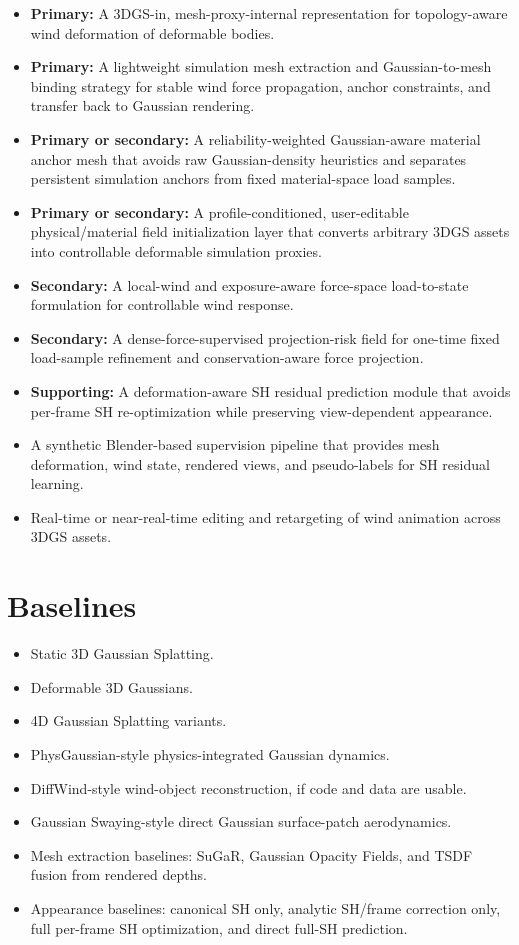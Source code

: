 \documentclass[11pt]{article}
\begin{document}
\begin{itemize}
  \item \textbf{Primary:} A 3DGS-in, mesh-proxy-internal representation for topology-aware wind deformation of deformable bodies.
  \item \textbf{Primary:} A lightweight simulation mesh extraction and Gaussian-to-mesh binding strategy for stable wind force propagation, anchor constraints, and transfer back to Gaussian rendering.
  \item \textbf{Primary or secondary:} A reliability-weighted Gaussian-aware material anchor mesh that avoids raw Gaussian-density heuristics and separates persistent simulation anchors from fixed material-space load samples.
  \item \textbf{Primary or secondary:} A profile-conditioned, user-editable physical/material field initialization layer that converts arbitrary 3DGS assets into controllable deformable simulation proxies.
  \item \textbf{Secondary:} A local-wind and exposure-aware force-space load-to-state formulation for controllable wind response.
  \item \textbf{Secondary:} A dense-force-supervised projection-risk field for one-time fixed load-sample refinement and conservation-aware force projection.
  \item \textbf{Supporting:} A deformation-aware SH residual prediction module that avoids per-frame SH re-optimization while preserving view-dependent appearance.
  \item A synthetic Blender-based supervision pipeline that provides mesh deformation, wind state, rendered views, and pseudo-labels for SH residual learning.
  \item Real-time or near-real-time editing and retargeting of wind animation across 3DGS assets.
\end{itemize}

\section{Baselines}

\begin{itemize}
  \item Static 3D Gaussian Splatting.
  \item Deformable 3D Gaussians.
  \item 4D Gaussian Splatting variants.
  \item PhysGaussian-style physics-integrated Gaussian dynamics.
  \item DiffWind-style wind-object reconstruction, if code and data are usable.
  \item Gaussian Swaying-style direct Gaussian surface-patch aerodynamics.
  \item Mesh extraction baselines: SuGaR, Gaussian Opacity Fields, and TSDF fusion from rendered depths.
  \item Appearance baselines: canonical SH only, analytic SH/frame correction only, full per-frame SH optimization, and direct full-SH prediction.
\end{itemize}
\end{document}
